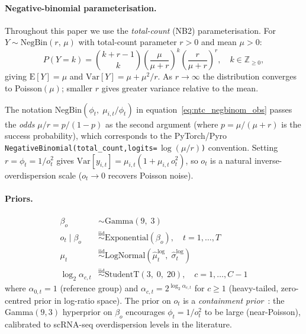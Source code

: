 \documentclass[12pt]{article}
\newcommand{\NB}{\mathrm{NegBin}}
\newcommand{\given}{\mid}
\newcommand{\iid}{\overset{\mathrm{iid}}{\sim}}
\begin{document}
\paragraph{Negative-binomial parameterisation.}
Throughout this paper we use the \emph{total-count} (NB2) parameterisation.
For $Y \sim \NB(r,\, \mu)$ with total-count parameter $r > 0$ and mean $\mu > 0$:
\begin{equation}
  P(Y = k) = \binom{k + r - 1}{k}
    \left(\frac{\mu}{\mu + r}\right)^{\!k}
    \left(\frac{r}{\mu + r}\right)^{\!r},
    \quad k \in \mathbb{Z}_{\ge 0},
  \label{eq:nb_pmf}
\end{equation}
giving $\mathrm{E}[Y] = \mu$ and $\mathrm{Var}[Y] = \mu + \mu^2/r$.
As $r \to \infty$ the distribution converges to Poisson$(\mu)$; smaller $r$ gives
greater variance relative to the mean.

The notation $\NB(\phi_t,\; \mu_{i,t}/\phi_t)$ in equation~\eqref{eq:ntc_negbinom_obs}
passes the \emph{odds} $\mu/r = p/(1{-}p)$ as the second argument
(where $p = \mu/(\mu+r)$ is the success probability), which corresponds to the
PyTorch/Pyro \texttt{NegativeBinomial(total\_count,\;logits=}\,$\log(\mu/r)$\texttt{)} convention.
Setting $r = \phi_t = 1/o_t^2$ gives
$\mathrm{Var}[y_{i,t}] = \mu_{i,t}\!\left(1 + \mu_{i,t}\,o_t^2\right)$,
so $o_t$ is a natural inverse-overdispersion scale ($o_t \to 0$ recovers Poisson noise).

\paragraph{Priors.}

\begin{align}
  \beta_o &\sim \mathrm{Gamma}(9,\; 3)
    \label{eq:ntc_beta_o} \\
  o_t \given \beta_o &\iid \mathrm{Exponential}(\beta_o), \quad t = 1,\ldots,T
    \label{eq:ntc_o_t} \\
  \mu_t &\iid \mathrm{LogNormal}\!\left(\hat\mu_t^{\log},\; \hat\sigma_t^{\log}\right)
    \label{eq:ntc_mu_t} \\
  \log_2 \alpha_{c,t} &\iid \mathrm{StudentT}(3,\; 0,\; 20),
    \quad c = 1,\ldots,C-1
    \label{eq:ntc_alpha_t}
\end{align}
%
where $\alpha_{0,t} = 1$ (reference group) and $\alpha_{c,t} = 2^{\log_2\alpha_{c,t}}$
for $c \ge 1$ (heavy-tailed, zero-centred prior in log-ratio space).
The prior on $o_t$ is a \emph{containment prior}~\cite{kleshchevnikov2022}: the
Gamma$(9,3)$ hyperprior on $\beta_o$ encourages $\phi_t = 1/o_t^2$ to be large
(near-Poisson), calibrated to scRNA-seq overdispersion levels in the literature.
\end{document}
